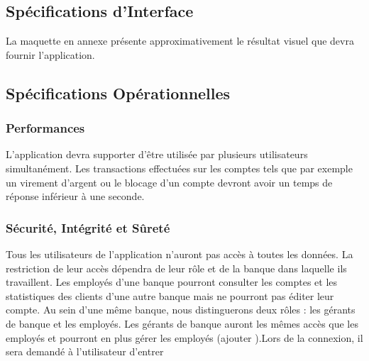 \subsection{Spécifications d'Interface}
La maquette en annexe présente approximativement le résultat visuel que devra fournir l’application.

\subsection{Spécifications Opérationnelles}

\subsubsection{Performances}

{\color{orange}{L’application devra être performante sous deux systèmes d’exploitation : Linux et Windows.}}{\color{green}{Par manque de temps, nous avons pas eu le temps de tester notre applications sous Windows.}} L’application devra supporter d’être utilisée par plusieurs utilisateurs simultanément. {\color{orange}{Ces utilisateurs ne pourront pas accéder au même compte en banque en même temps mais pourront effectuer des manipulations sur des comptes différents en même temps.}}{\color{green}{Les utilisateurs peuvent accéder au même compte en même temps et effectuer des opérations}} Les transactions effectuées sur les comptes tels que par exemple un virement d’argent ou le blocage d’un compte devront avoir un temps de réponse inférieur à une seconde.

\subsubsection{Sécurité, Intégrité et Sûreté}

Tous les utilisateurs de l’application n’auront pas accès à toutes les données. La restriction de leur accès dépendra de leur rôle et de la banque dans laquelle ils travaillent. Les employés d’une banque pourront consulter les comptes et les statistiques des clients d’une autre banque mais ne pourront pas éditer leur compte. Au sein d’une même banque, nous distinguerons deux rôles : les gérants de banque et les employés. Les gérants de banque auront les mêmes accès que les employés et pourront en plus gérer les employés (ajouter {\color{red}{ou supprimer des employés, modifier leur salaire}}).Lors de la connexion, il sera demandé à l’utilisateur d’entrer {\color{orange}{son nom, sa banque et son mot de passe.}} {\color{green}{L'utilisateur a uniquement besoin d'entrer son identifiant et son mot de passe.}} {\color{orange}{Grâce à son nom et sa banque, il sera possible de retrouver son rôle afin d’appliquer les restrictions nécessaires.}}{\color{green}{Grâce à son identifiant, il sera possible de retrouver sa banque et son rôle afin d'appliquer les restrictions nécessaires}}

